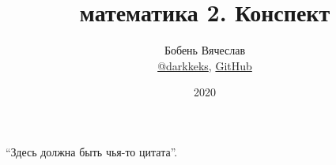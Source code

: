 \documentclass[a4paper]{article}
\title{\HugeДискретная математика 2. Конспект}
\author{
	Бобень Вячеслав \\
	\href{https://t.me/darkkeks}{@darkkeks},
    \href{https://github.com/hse-tex/hse-tex}{GitHub}
}
\date{2020}
\begin{document}
    \maketitle

    \epigraph{
        ``Здесь должна быть чья-то цитата''.
    }{}

    \tableofcontents

    \newpage

    
\end{document}
